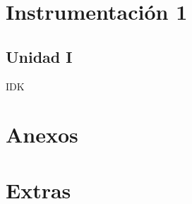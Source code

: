 \documentclass[11pt,fleqn]{book} %
\begin{document}
\part{Instrumentación 1}

\chapter{Unidad I}
IDK

\part{Anexos}











\part{Extras}
\end{document}
